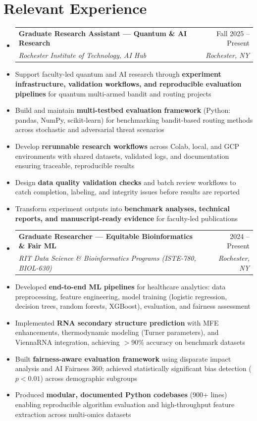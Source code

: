 \documentclass[10pt]{article}
\makeatletter
\newcommand{\resumeItem}[1]{\item\small{#1}}
\newcommand{\resumeSubheading}[4]{
  \vspace{-1pt}\item
  \begin{tabular*}{0.97\textwidth}[t]{l@{\extracolsep{\fill}}r}
    \textbf{#1} & #2 \\
    \textit{\small#3} & \textit{\small #4} \\
  \end{tabular*}\vspace{-5pt}
}
\makeatother
\begin{document}

\section{Relevant Experience}

\begin{itemize}[leftmargin=*,label={}]
  \resumeSubheading
    {Graduate Research Assistant --- Quantum \& AI Research}{Fall 2025 -- Present}
    {Rochester Institute of Technology, AI Hub}{Rochester, NY}
    \resumeItem{Support faculty-led quantum and AI research through \textbf{experiment infrastructure, validation workflows, and reproducible evaluation pipelines} for quantum multi-armed bandit and routing projects}
    \resumeItem{Build and maintain \textbf{multi-testbed evaluation framework} (Python: pandas, NumPy, scikit-learn) for benchmarking bandit-based routing methods across stochastic and adversarial threat scenarios}
    \resumeItem{Develop \textbf{rerunnable research workflows} across Colab, local, and GCP environments with shared datasets, validated logs, and documentation ensuring traceable, reproducible results}
    \resumeItem{Design \textbf{data quality validation checks} and batch review workflows to catch completion, labeling, and integrity issues before results are reported}
    \resumeItem{Transform experiment outputs into \textbf{benchmark analyses, technical reports, and manuscript-ready evidence} for faculty-led publications}

  \vspace{4pt}
  \resumeSubheading
    {Graduate Researcher --- Equitable Bioinformatics \& Fair ML}{2024 -- Present}
    {RIT Data Science \& Bioinformatics Programs (ISTE-780, BIOL-630)}{Rochester, NY}
    \resumeItem{Developed \textbf{end-to-end ML pipelines} for healthcare analytics: data preprocessing, feature engineering, model training (logistic regression, decision trees, random forests, XGBoost), evaluation, and fairness assessment}
    \resumeItem{Implemented \textbf{RNA secondary structure prediction} with MFE enhancements, thermodynamic modeling (Turner parameters), and ViennaRNA integration, achieving $>$90\% accuracy on benchmark datasets}
    \resumeItem{Built \textbf{fairness-aware evaluation framework} using disparate impact analysis and AI Fairness 360; achieved statistically significant bias detection ($p < 0.01$) across demographic subgroups}
    \resumeItem{Produced \textbf{modular, documented Python codebases} (900+ lines) enabling reproducible algorithm evaluation and high-throughput feature extraction across multi-omics datasets}


\end{itemize}
\end{document}
